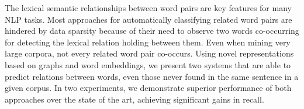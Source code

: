 The lexical semantic relationships between word pairs are key features for many NLP tasks.  Most approaches for automatically classifying related word pairs are hindered by data sparsity because of their need to observe two words co-occurring for detecting the lexical relation holding between them. Even when mining very large corpora, not every related word pair co-occurs.  Using novel representations based on graphs and word embeddings, we present two systems that are able to predict relations between words, even those never found in the same sentence in a given corpus.  In two experiments, we demonstrate superior performance of both approaches over the state of the art, achieving significant gains in recall.

